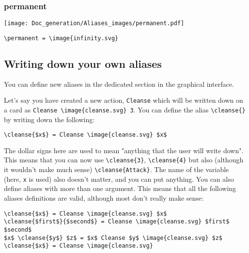 \documentclass{article}
\begin{document}
\subsubsection{permanent}
\begin{minipage}{0.45\linewidth}
\raggedright
\begin{spverbatim}
\permanent 
\end{spverbatim}
\end{minipage}
\begin{minipage}{0.45\linewidth}
\raggedleft
\texttt{[image: Doc\_generation/Aliases\_images/permanent.pdf]}
\end{minipage}
\begin{center}
\begin{BVerbatim}
\permanent = \image{infinity.svg}
\end{BVerbatim}
\end{center}




\subsection{Writing down your own aliases}
You can define new aliases in the dedicated section in the graphical interface.

Let's say you have created a new action, \verb`Cleanse` which will be written down on a card as \verb`Cleanse \image{cleanse.svg} 3`. You can define the alias \verb`\cleanse{}` by writing down the following:

\begin{center}
\begin{BVerbatim}
\cleanse{$x$} = Cleanse \image{cleanse.svg} $x$
\end{BVerbatim}
\end{center}

The dollar signs here are used to mean "anything that the user will write down". This means that you can now use \verb`\cleanse{3}`, \verb`\cleanse{4}` but also (although it wouldn't make much sense) \verb`\cleanse{Attack}`. The name of the variable (here, \verb`x` is used) also doesn't matter, and you can put anything. You can also define aliases with more than one argument. This means that all the following aliases definitions are valid, although most don't really make sense:

\begin{center}
\begin{BVerbatim}
\cleanse{$x$} = Cleanse \image{cleanse.svg} $x$
\cleanse{$first$}{$second$} = Cleanse \image{cleanse.svg} $first$ $second$
$x$ \cleanse{$y$} $z$ = $x$ Cleanse $y$ \image{cleanse.svg} $z$
\cleanse{$x$} = Cleanse \image{cleanse.svg}
\end{BVerbatim}
\end{center}
\end{document}
